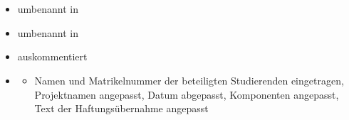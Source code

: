 \section{}
\begin{itemize}
	\item {} umbenannt in 
	\item {} umbenannt in 
	\item {} auskommentiert
	\item {}
	    \begin{itemize}
		\item Namen und Matrikelnummer der beteiligten Studierenden eingetragen, Projektnamen angepasst, Datum abgepasst, Komponenten angepasst, Text der Haftungsübernahme angepasst
       	\end{itemize}
\end{itemize}

